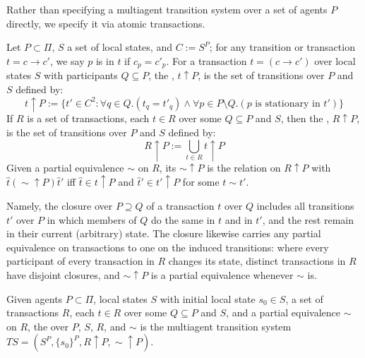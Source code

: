 Rather than specifying a multiagent transition system over a set of agents $P$ directly, we specify it via atomic transactions.

\begin{definition}\label{def:closure}
Let $P\subset \Pi$, $S$ a set of local states, and $C:=S^P$; for any transition or transaction $t = c\rightarrow c'$, we say $p$ is  in $t$ if $c_p = c'_p$.
For a transaction $t=(c\rightarrow c')$ over local states $S$ with participants $Q \subseteq P$, the , $t{\uparrow}P$, is the set of transitions over $P$ and $S$ defined by:
$$
t{\uparrow}P := \{ t' \in C^2 :
\forall q\in Q.(t_q = t'_q) \wedge \forall p\in P\setminus Q.(p\text{ is stationary in }t')\}
$$
If $R$ is a set of transactions, each $t\in R$ over some $Q\subseteq P$ and $S$, then the , $R{\uparrow}P$, is the set of transitions over $P$ and $S$ defined by:
$$
R{\uparrow}P := \bigcup_{t\in R} t{\uparrow}P
$$
Given a partial equivalence ${\sim}$ on $R$, its  ${\sim}{\uparrow}P$ is the relation on $R{\uparrow}P$ with $\hat t \mathrel{({\sim}{\uparrow}P)} \hat t'$ iff $\hat t \in t{\uparrow}P$ and $\hat t' \in t'{\uparrow}P$ for some $t \sim t'$.
\end{definition}

Namely, the closure over $P\supseteq Q$ of a transaction $t$ over $Q$ includes all transitions $t'$ over $P$ in which members of $Q$ do the same in $t$ and in $t'$, and the rest remain in their current (arbitrary) state. The closure likewise carries any partial equivalence on transactions to one on the induced transitions: where every participant of every transaction in $R$ changes its state, distinct transactions in $R$ have disjoint closures, and ${\sim}{\uparrow}P$ is a partial equivalence whenever ${\sim}$ is.

\begin{definition}\label{def:tbmts}
Given agents $P \subset \Pi$, local states $S$ with initial local state $s_0\in S$, a set of transactions $R$, each $t\in R$ over some $Q\subseteq P$ and $S$, and a partial equivalence ${\sim}$ on $R$, the  over $P$, $S$, $R$, and ${\sim}$ is the multiagent transition system $TS= (S^P,\{s_0\}^P,R{\uparrow}P,{\sim}{\uparrow}P)$.
\end{definition}



